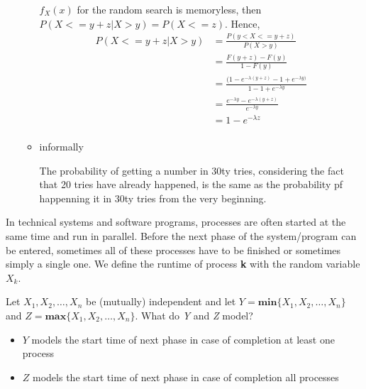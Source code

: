\documentclass{homework}
\begin{document}
\begin{enumerate}
\begin{itemize}
		$f_X(x)$ for the random search is memoryless, then $P(X <= y + z | X > y) = P(X <= z)$. Hence, 
		\begin{align*}
		P(X <= y + z | X > y) &= \frac{P(y < X <= y + z )}{P(X > y)} \\
		&= \frac{F(y+z) - F(y)}{1-F(y)} \\
		&= \frac{(1-e^{-\lambda(y+z)}-1+e^{-\lambda y)}}{1 - 1 + e^{-\lambda y}} \\
		&= \frac{e^{-\lambda y} - e^{-\lambda (y+z)}}{e^{-\lambda y}} \\
		&= 1-e^{-\lambda z} \\
		\end{align*}
		\item informally
		
		The probability of getting a number in 30ty tries, considering the fact that 20 tries have already happened, is the same as the probability pf happenning it in 30ty tries from the very beginning.
	\end{itemize}
\end{enumerate}

\exercise*
In technical systems and software programs, processes are often started at the same time and run in parallel. Before the next phase of the system/program can be entered, sometimes all of these processes have to be finished or sometimes simply a single one. We define the runtime of process \textbf{k} with the random variable $X_k$.

Let $X_1, X_2,\dots,X_n$ be (mutually) independent and let $Y = \textbf{min}\{X_1, X_2,\dots,X_n\}$ and \newline $Z = \textbf{max}\{X_1, X_2,\dots,X_n\}$. What do \emph{Y} and \emph{Z} model?

\begin{itemize}
	\item $Y$ models the start time of next phase in case of completion at least one process
	\item $Z$ models the start time of next phase in case of completion all processes
\end{itemize}
\end{document}
